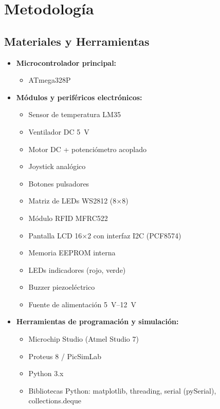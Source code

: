 \section{Metodología}

\subsection{Materiales y Herramientas}

\begin{itemize}
    \item \textbf{Microcontrolador principal:}
    \begin{itemize}
        \item ATmega328P
    \end{itemize}

    \item \textbf{Módulos y periféricos electrónicos:}
    \begin{itemize}
        \item Sensor de temperatura LM35
        \item Ventilador DC 5~V
        \item Motor DC + potenciómetro acoplado
        \item Joystick analógico
        \item Botones pulsadores
        \item Matriz de LEDs WS2812 (8×8)
        \item Módulo RFID MFRC522
        \item Pantalla LCD 16×2 con interfaz I2C (PCF8574)
        \item Memoria EEPROM interna
        \item LEDs indicadores (rojo, verde)
        \item Buzzer piezoeléctrico
        \item Fuente de alimentación 5~V–12~V
    \end{itemize}

    \item \textbf{Herramientas de programación y simulación:}
    \begin{itemize}
        \item Microchip Studio (Atmel Studio 7)
        \item Proteus 8 / PicSimLab
        \item Python 3.x
        \item Bibliotecas Python: matplotlib, threading, serial (pySerial), collections.deque
    \end{itemize}
\end{itemize}




